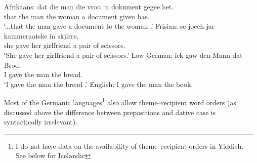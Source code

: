 \begin{exe}
\begin{xlist}
\ex Afrikaans:\label{ex:af-rt}
\gll dat die man die vrou `n dokument gegee het.\\
that the man the woman a document given has.\\
\trans `...that the man gave a document to the woman \citep{Louw.2012}.'
\ex Frisian:\label{ex:fri-rt}
\gll se joech jar kammeraatske in skjirre.\\
she gave her girlfriend a {pair of scissors}.\\
\trans `She gave her girlfriend a pair of scissors.'
\ex Low German: \label{ex:lg-rt}
\gll ick gaw den Mann dat Brod.\\
I gave the man the bread.\\
\trans `I gave the man the bread \citep{Mussaus.1829}.'
\ex English: I gave the man the book.\label{ex:eng-rt}
\end{xlist}
\end{exe}

Most of the Germanic languages\footnote{I do not have data on the availability of theme--recipient orders in Yiddish. See below for Icelandic} also allow theme--recipient word orders (as discussed above the difference between prepositions and dative case is syntactically irrelevant).

